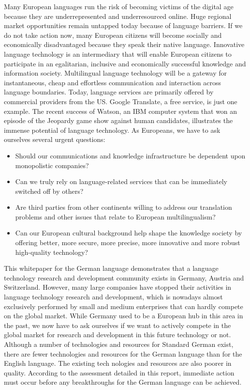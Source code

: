 \documentclass[]{../metanetpaper}
\begin{document}
Many European languages run the risk of becoming victims of the digital age because they are underrepresented and underresourced online. Huge regional market opportunities remain untapped today because of language barriers. If we do not take action now, many European citizens will become socially and economically disadvantaged because they speak their native language. Innovative language technology is an intermediary that will enable European citizens to participate in an egalitarian, inclusive and economically successful knowledge and information society. Multilingual language technology will be a gateway for instantaneous, cheap and effortless communication and interaction across language boundaries. Today, language services are primarily offered by commercial providers from the US. Google Translate, a free service, is just one example. The recent success of Watson, an IBM computer system that won an episode of the Jeopardy game show against human candidates, illustrates the immense potential of language technology. As Europeans, we have to ask ourselves several urgent questions:
\\
\begin {itemize}
\item Should our communications and knowledge infrastructure be dependent upon monopolistic companies?
\item Can we truly rely on language-related services that can be immediately switched off by others?
\item Are third parties from other continents willing to address our translation problems and other issues that relate to European multilingualism?
\item Can our European cultural background help shape the knowledge society by offering better, more secure, more precise, more innovative and more robust high-quality technology?
\end {itemize}
This whitepaper for the German language demonstrates that a language technology research and development community exists in Germany, Austria and Switzerland. However, many large companies have stopped their activities in language technology research and development, which is nowadays almost exclusively performed by small and medium enterprises that can hardly compete on the global market. While Germany used to be a European hub in this area in the past, we now have to ask ourselves if we want to actively compete in the global market for research and development in this
future technology or not. Although a number of technologies and resources for Standard German exist, there are fewer technologies and resources for the German language than for the English language. The existing tech nologies and resources are also poorer in quality. According to the assessment detailed in this report, immediate
action must occur before any breakthroughs for the German language can be achieved.
\end{document}
